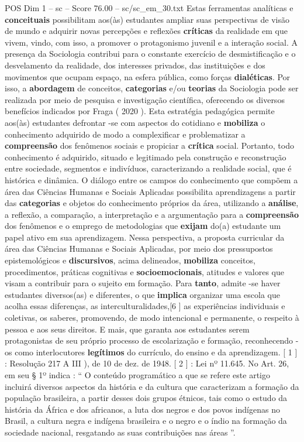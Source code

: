 \begin{textsample}{POS Dim 1 – sc – Score 76.00 – sc/sc\_em\_30.txt}
Estas ferramentas analíticas e \textbf{conceituais} possibilitam aos(às) estudantes ampliar suas perspectivas de visão de mundo e adquirir novas percepções e reflexões \textbf{críticas} da realidade em que vivem, vindo, com isso, a promover o protagonismo juvenil e a interação social.
A presença da Sociologia contribui para o constante exercício de desmistificação e o desvelamento da realidade, dos interesses privados, das instituições e dos movimentos que ocupam espaço, na esfera pública, como forças \textbf{dialéticas}.
Por isso, a \textbf{abordagem} de conceitos, \textbf{categorias} e/ou \textbf{teorias} da Sociologia pode ser realizada por meio de pesquisa e investigação científica, oferecendo os diversos benefícios indicados por Fraga ( 2020 ).
Esta estratégia pedagógica permite aos(às) estudantes defrontar -se com aspectos do cotidiano e \textbf{mobiliza} o conhecimento adquirido de modo a complexificar e problematizar a \textbf{compreensão} dos fenômenos sociais e propiciar a \textbf{crítica} social.
Portanto, todo conhecimento é adquirido, situado e legitimado pela construção e reconstrução entre sociedade, segmentos e indivíduos, caracterizando a realidade social, que é histórica e dinâmica.
O diálogo entre os campos do conhecimento que compõem a área das Ciências Humanas e Sociais Aplicadas possibilita aprendizagens a partir das \textbf{categorias} e objetos do conhecimento próprios da área, utilizando a \textbf{análise}, a reflexão, a comparação, a interpretação e a argumentação para a \textbf{compreensão} dos fenômenos e o emprego de metodologias que \textbf{exijam} do(a) estudante um papel ativo em sua aprendizagem.
Nessa perspectiva, a proposta curricular da área das Ciências Humanas e Sociais Aplicadas, por meio dos pressupostos epistemológicos e \textbf{discursivos}, acima delineados, \textbf{mobiliza} conceitos, procedimentos, práticas cognitivas e \textbf{socioemocionais}, atitudes e valores que visam a contribuir para o sujeito em formação.
Para \textbf{tanto}, admite -se haver estudantes diversos(as) e diferentes, o que \textbf{implica} organizar uma escola que acolha essas diferenças, as interculturalidades,[6 ] as experiências individuais e coletivas, os saberes, promovendo, de modo intencional e permanente, o respeito à pessoa e aos seus direitos.
E mais, que garanta aos estudantes serem protagonistas de seu próprio processo de escolarização e formação, reconhecendo -os como interlocutores \textbf{legítimos} do currículo, do ensino e da aprendizagem. [ 1 ] : Resolução 217 A III ), de 10 de dez. de 1948. [ 2 ] : Lei nº 11.645.
No Art. 26, em seu § 1º indica : “ O conteúdo programático a que se refere este artigo incluirá diversos aspectos da história e da cultura que caracterizam a formação da população brasileira, a partir desses dois grupos étnicos, tais como o estudo da história da África e dos africanos, a luta dos negros e dos povos indígenas no Brasil, a cultura negra e indígena brasileira e o negro e o índio na formação da sociedade nacional, resgatando as suas contribuições nas áreas ”.

\end{textsample}
